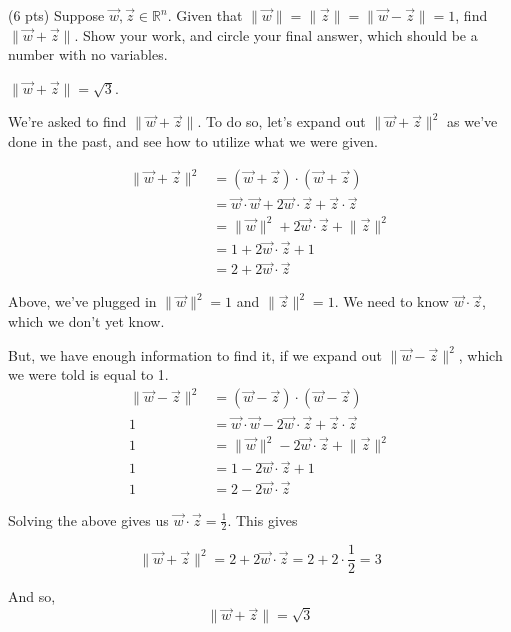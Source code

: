 \documentclass[11pt]{article}
\begin{document}
\begin{prob}
\begin{subprob}
\begin{solution}
\end{solution}

\end{subprob}

\begin{subprob}(6 pts)
Suppose $\vec w, \vec z \in \mathbb{R}^n$. Given that $\lVert \vec w \rVert = \lVert \vec z \rVert = \lVert \vec w - \vec z \rVert = 1$, find $\lVert \vec w + \vec z \rVert$. Show your work, and $\boxed{\text{circle}}$ your final answer, which should be a number with no variables. \\

\emptybox{11cm}

\begin{solution}
$\lVert \vec w + \vec z \rVert = \sqrt{3}$.

We're asked to find $\lVert \vec w + \vec z \rVert$. To do so, let's expand out $\lVert \vec w + \vec z \rVert^2$ as we've done in the past, and see how to utilize what we were given.

\begin{align*}
  \lVert \vec w + \vec z \rVert^2 &= (\vec w + \vec z) \cdot (\vec w + \vec z) \\
  &= \vec w \cdot \vec w + 2 \vec w \cdot \vec z + \vec z \cdot \vec z \\
  &= \lVert \vec w \rVert^2 + 2 \vec w \cdot \vec z + \lVert \vec z \rVert^2 \\
  &= 1 + 2 \vec w \cdot \vec z + 1 \\
  &= 2 + 2 \vec w \cdot \vec z
\end{align*}

Above, we've plugged in $\lVert \vec w \rVert^2 = 1$ and $\lVert \vec z \rVert^2 = 1$. We need to know $\vec w \cdot \vec z$, which we don't yet know.

But, we have enough information to find it, if we expand out $\lVert \vec w - \vec z \rVert^2$, which we were told is equal to 1.
\begin{align*}
  \lVert \vec w - \vec z \rVert^2 &= (\vec w - \vec z) \cdot (\vec w - \vec z) \\
  1 &= \vec w \cdot \vec w - 2 \vec w \cdot \vec z + \vec z \cdot \vec z \\
  1 &= \lVert \vec w \rVert^2 - 2 \vec w \cdot \vec z + \lVert \vec z \rVert^2 \\
  1 &= 1 - 2 \vec w \cdot \vec z + 1 \\
  1 &= 2 - 2 \vec w \cdot \vec z
\end{align*}

Solving the above gives us $\vec w \cdot \vec z = \frac{1}{2}$. This gives

$$\lVert \vec w + \vec z \rVert^2 = 2 + 2 \vec w \cdot \vec z = 2 + 2 \cdot \frac{1}{2} = 3$$

And so, $$\lVert \vec w + \vec z \rVert = \sqrt{3}$$

\end{solution}

\end{subprob}

\end{prob}
\end{document}

